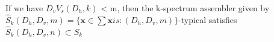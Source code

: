 \documentclass[preview]{standalone}
\begin{document}
\begin{center}
If we have ${D}_v{V}_s({D}_h, k)$ < m, then the k-spectrum assembler given by $\hat{S}_k({D}_h, {D}_v, m) = \{\textbf{x} \in \sum \textbf{x} is : ({D}_h, {D}_v, m)\}$-typical satisfies $\hat{S}_k({D}_h, {D}_v, n) \subset {S}_k$
\end{center}
\end{document}
